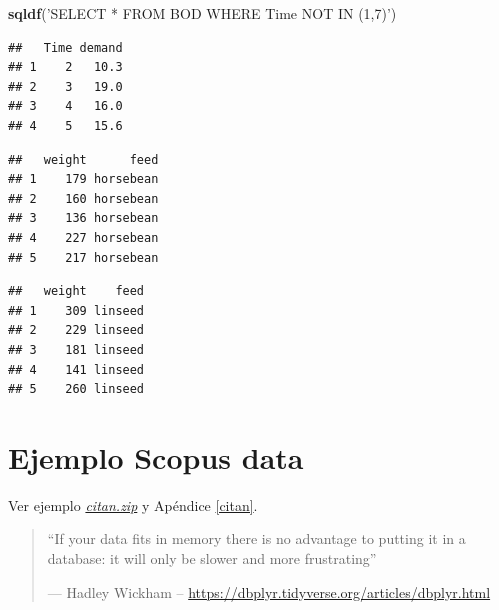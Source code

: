 \documentclass[]{book}
\newenvironment{Shaded}{\begin{snugshade}}{\end{snugshade}}
\newcommand{\KeywordTok}[1]{\textcolor[rgb]{0.13,0.29,0.53}{\textbf{#1}}}
\newcommand{\NormalTok}[1]{#1}
\newcommand{\StringTok}[1]{\textcolor[rgb]{0.31,0.60,0.02}{#1}}
\begin{document}
\begin{Shaded}
\begin{Highlighting}[]
\KeywordTok{sqldf}\NormalTok{(}\StringTok{'SELECT * FROM BOD WHERE Time NOT IN (1,7)'}\NormalTok{)}
\end{Highlighting}
\end{Shaded}

\begin{verbatim}
##   Time demand
## 1    2   10.3
## 2    3   19.0
## 3    4   16.0
## 4    5   15.6
\end{verbatim}

\begin{Shaded}
\end{Shaded}

\begin{verbatim}
##   weight      feed
## 1    179 horsebean
## 2    160 horsebean
## 3    136 horsebean
## 4    227 horsebean
## 5    217 horsebean
\end{verbatim}

\begin{Shaded}
\end{Shaded}

\begin{verbatim}
##   weight    feed
## 1    309 linseed
## 2    229 linseed
## 3    181 linseed
## 4    141 linseed
## 5    260 linseed
\end{verbatim}

\hypertarget{ejemplo-scopus-data}{%
\section{Ejemplo Scopus data}\label{ejemplo-scopus-data}}

Ver ejemplo \href{data/citan.zip}{\emph{citan.zip}} y Apéndice \ref{citan}.

\begin{quote}
``If your data fits in memory
there is no advantage to putting it in a database:
it will only be slower and more frustrating''

--- Hadley Wickham -- \url{https://dbplyr.tidyverse.org/articles/dbplyr.html}
\end{quote}
\end{document}
